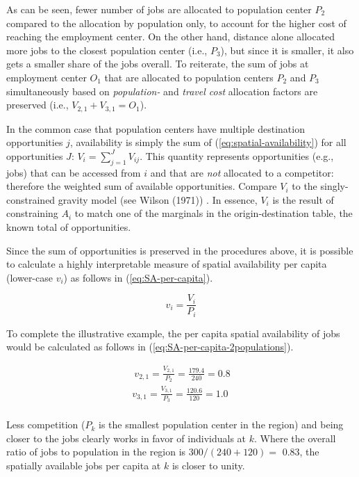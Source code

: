 \documentclass[]{elsarticle} %
\begin{document}
As can be seen, fewer number of jobs are allocated to population center
\(P_2\) compared to the allocation by population only, to account for
the higher cost of reaching the employment center. On the other hand,
distance alone allocated more jobs to the closest population center
(i.e., \(P_3\)), but since it is smaller, it also gets a smaller share
of the jobs overall. To reiterate, the sum of jobs at employment center
\(O_1\) that are allocated to population centers \(P_2\) and \(P_3\)
simultaneously based on \emph{population-} and \emph{travel cost}
allocation factors are preserved (i.e., \(V_{2,1} + V_{3,1} = O_1\)).

In the common case that population centers have multiple destination
opportunities \(j\), availability is simply the sum of
(\ref{eq:spatial-availability}) for all opportunities \(J\):
\(V_i = \sum_{j=1}^J V_{ij}\). This quantity represents opportunities
(e.g., jobs) that can be accessed from \(i\) and that are \emph{not}
allocated to a competitor: therefore the weighted sum of available
opportunities. Compare \(V_i\) to the singly-constrained gravity model
(see Wilson (1971)) . In essence, \(V_i\) is the result of constraining
\(A_i\) to match one of the marginals in the origin-destination table,
the known total of opportunities.

Since the sum of opportunities is preserved in the procedures above, it
is possible to calculate a highly interpretable measure of spatial
availability per capita (lower-case \(v_i\)) as follows in
(\ref{eq:SA-per-capita}).

\begin{equation}
\label{eq:SA-per-capita}
v_i = \frac{V_i}{P_i}
\end{equation}

To complete the illustrative example, the per capita spatial
availability of jobs would be calculated as follows in
(\ref{eq:SA-per-capita-2populations}).

\begin{equation}
\label{eq:SA-per-capita-2populations}
\begin{array}{l}\
v_{2,1} = \frac{V_{2,1}}{P_2} =  \frac{179.4}{240} = 0.8\\
v_{3,1} =  \frac{V_{3,1}}{P_3} =  \frac{120.6}{120} = 1.0\\
\end{array}
\end{equation}

Less competition (\(P_k\) is the smallest population center in the
region) and being closer to the jobs clearly works in favor of
individuals at \(k\). Where the overall ratio of jobs to population in
the region is \(300/(240 + 120)=\) 0.83, the spatially available jobs
per capita at \(k\) is closer to unity.
\end{document}
